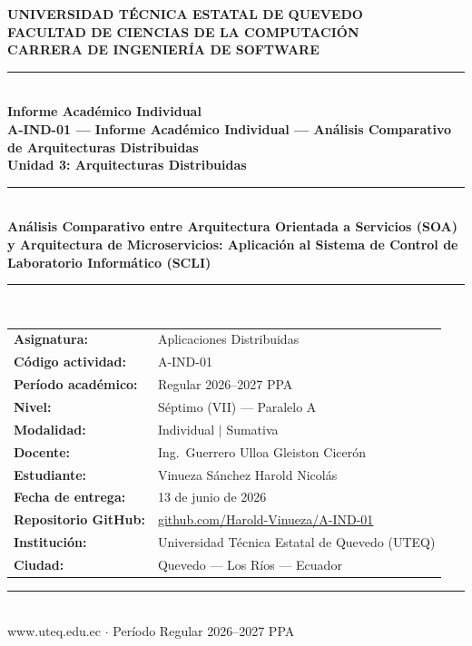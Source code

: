 \documentclass[conference,a4paper]{IEEEtran}
\begin{document}
\begin{titlepage}
  \centering
  \vspace*{0.3cm}
  \textbf{\large UNIVERSIDAD T\'ECNICA ESTATAL DE QUEVEDO}\\[0.2cm]
  \textbf{\large FACULTAD DE CIENCIAS DE LA COMPUTACI\'ON}\\[0.2cm]
  \textbf{CARRERA DE INGENIER\'IA DE SOFTWARE}\\[0.5cm]
  \rule{\linewidth}{0.8pt}\\[0.4cm]
  {\LARGE \bfseries Informe Acad\'emico Individual}\\[0.25cm]
  {\large \bfseries A-IND-01 --- Informe Acad\'emico Individual ---
  An\'alisis Comparativo de Arquitecturas Distribuidas}\\[0.25cm]
  {\large \bfseries Unidad 3: Arquitecturas Distribuidas}\\[0.45cm]
  \rule{\linewidth}{0.4pt}\\[0.45cm]
  {\LARGE \bfseries An\'alisis Comparativo entre Arquitectura
  Orientada a Servicios (SOA) y Arquitectura de Microservicios:
  Aplicaci\'on al Sistema de Control de Laboratorio
  Inform\'atico (SCLI)}\\[0.6cm]
  \rule{\linewidth}{0.8pt}\\[0.5cm]
  \begin{tabular}{ll}
    \textbf{Asignatura:}            & Aplicaciones Distribuidas\\[0.18cm]
    \textbf{C\'odigo actividad:}    & A-IND-01\\[0.18cm]
    \textbf{Per\'iodo acad\'emico:} & Regular 2026--2027 PPA\\[0.18cm]
    \textbf{Nivel:}                 & S\'eptimo (VII) --- Paralelo A\\[0.18cm]
    \textbf{Modalidad:}             & Individual $|$ Sumativa\\[0.18cm]
    \textbf{Docente:}               & Ing.\ Guerrero Ulloa Gleiston Cicer\'on\\[0.18cm]
    \textbf{Estudiante:}            & Vinueza S\'anchez Harold Nicol\'as\\[0.18cm]
    \textbf{Fecha de entrega:}      & 13 de junio de 2026\\[0.18cm]
    \textbf{Repositorio GitHub:}    &
      \href{https://github.com/Harold-Vinueza/TA-IND-01-Informe-Acad-mico-Individual-An-lisis-Comparativo-de-Arquitecturas-Distribuidas.git}{github.com/Harold-Vinueza/A-IND-01}\\[0.18cm]
    \textbf{Instituci\'on:}         & Universidad T\'ecnica Estatal de Quevedo (UTEQ)\\[0.18cm]
    \textbf{Ciudad:}                & Quevedo --- Los R\'ios --- Ecuador\\
  \end{tabular}
  \vfill
  \rule{\linewidth}{0.8pt}\\[0.2cm]
  {\small www.uteq.edu.ec $\cdot$ Per\'iodo Regular 2026--2027 PPA}
\end{titlepage}
\end{document}
